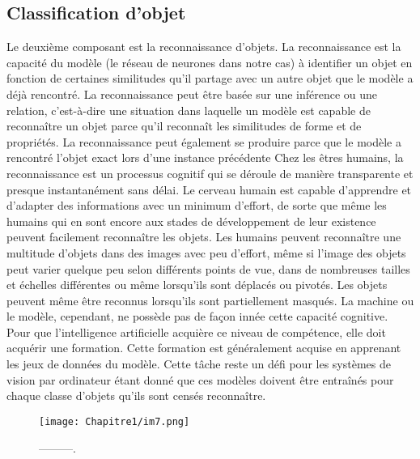 \subsection{Classification d'objet}
Le deuxième composant est la reconnaissance d'objets. La reconnaissance est la capacité du modèle (le réseau de neurones dans notre cas) à identifier un objet en fonction de certaines similitudes qu'il partage avec un autre objet que le modèle a déjà rencontré. La reconnaissance peut être basée sur une inférence ou une relation, c'est-à-dire une situation dans laquelle un modèle est capable de reconnaître un objet parce qu'il reconnaît les similitudes de
forme et de propriétés. La reconnaissance peut également se produire parce que le modèle a rencontré l'objet exact lors d'une instance précédente Chez les êtres humains, la reconnaissance est un processus cognitif qui se déroule de manière transparente et presque instantanément sans délai. Le cerveau humain est capable d'apprendre et d'adapter des informations avec un minimum d'effort, de sorte que même les humains qui en sont encore aux stades de développement de leur existence peuvent facilement reconnaître les objets. Les humains peuvent reconnaître une multitude d'objets dans des images avec peu d'effort, même si l'image des objets peut varier quelque peu selon différents points de vue, dans de nombreuses tailles et échelles
différentes ou même lorsqu'ils sont déplacés ou pivotés. Les objets peuvent même être reconnus lorsqu'ils sont partiellement masqués. La machine ou le modèle, cependant, ne possède pas de façon innée cette capacité cognitive.
Pour que l'intelligence artificielle acquière ce niveau de compétence, elle doit acquérir une formation. Cette formation est généralement acquise en apprenant les jeux de données du modèle. Cette tâche reste un défi pour les systèmes de vision par ordinateur étant donné que ces modèles doivent être entraînés pour chaque classe d'objets qu'ils sont censés reconnaître.

\begin{figure}[H]
\centering
\texttt{[image: Chapitre1/im7.png]}
\caption{---------.}
\label{im7}
\end{figure}


